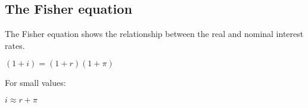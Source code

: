 
\subsection{The Fisher equation}

The Fisher equation shows the relationship between the real and nominal interest rates.

\((1+i)=(1+r)(1+\pi )\)

For small values:

\(i\approx r+\pi \)

